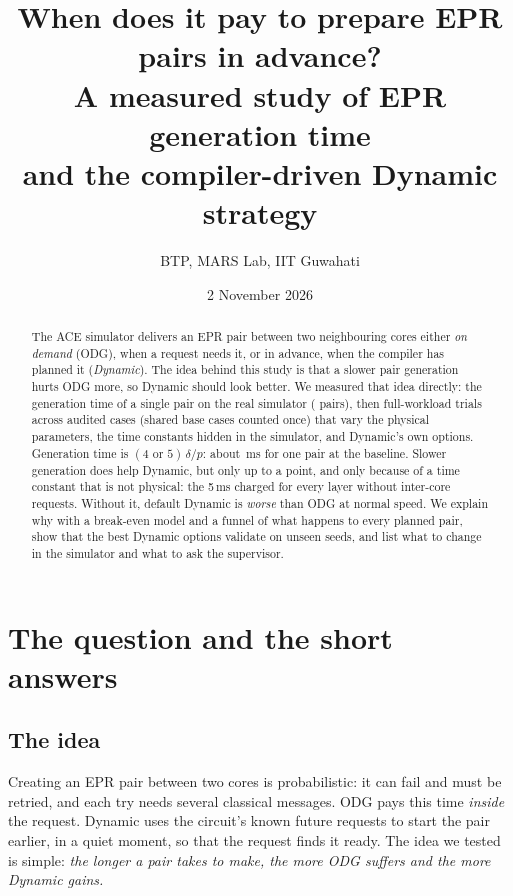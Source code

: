 \documentclass[11pt,a4paper]{report}
\title{When does it pay to prepare EPR pairs in advance?\\[3pt]\large A measured study of EPR generation time\\and the compiler-driven Dynamic strategy}
\author{BTP, MARS Lab, IIT Guwahati}
\date{2 November 2026}
\newcommand{\ms}{\,ms}
\begin{document}
\maketitle
\begin{abstract}\noindent
The ACE simulator delivers an EPR pair between two neighbouring cores either \emph{on demand} (ODG), when a request needs it, or in advance, when the compiler has planned it (\emph{Dynamic}). The idea behind this study is that a slower pair generation hurts ODG more, so Dynamic should look better. We measured that idea directly: the generation time of a single pair on the real simulator (\LinkPairs{} pairs), then \TotalTrials{} full-workload trials across \CasesAccepted{} audited cases (shared base cases counted once) that vary the physical parameters, the time constants hidden in the simulator, and Dynamic's own options.
Generation time is $(4\text{ or }5)\,\delta/p$: about \BaseGenMean{}\ms{} for one pair at the baseline. Slower generation does help Dynamic, but only up to a point, and only because of a time constant that is not physical: the 5\ms{} charged for every layer without inter-core requests. Without it, default Dynamic is \emph{worse} than ODG at normal speed. We explain why with a break-even model and a funnel of what happens to every planned pair, show that the best Dynamic options validate on unseen seeds, and list what to change in the simulator and what to ask the supervisor.
\end{abstract}
\tableofcontents

\chapter{The question and the short answers}
\section{The idea}
Creating an EPR pair between two cores is probabilistic: it can fail and must be retried, and each try needs several classical messages. ODG pays this time \emph{inside} the request. Dynamic uses the circuit's known future requests to start the pair earlier, in a quiet moment, so that the request finds it ready. The idea we tested is simple: \emph{the longer a pair takes to make, the more ODG suffers and the more Dynamic gains.}
\end{document}
